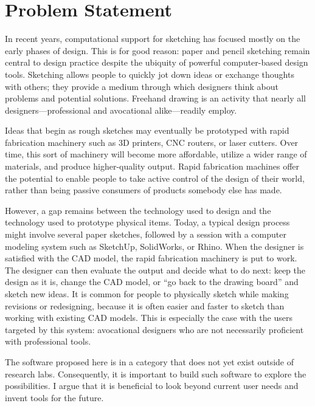 \documentclass[11pt]{article}
\begin{document}
\newpage

\section{Problem Statement}

In recent years, computational support for sketching has focused
mostly on the early phases of design. This is for good reason: paper
and pencil sketching remain central to design practice despite the
ubiquity of powerful computer-based design tools. Sketching allows
people to quickly jot down ideas or exchange thoughts with others;
they provide a medium through which designers think about problems and
potential solutions. Freehand drawing is an activity that nearly all
designers---professional and avocational alike---readily employ.

Ideas that begin as rough sketches may eventually be prototyped with
rapid fabrication machinery such as 3D printers, CNC routers, or laser
cutters. Over time, this sort of machinery will become more
affordable, utilize a wider range of materials, and produce
higher-quality output. Rapid fabrication machines offer the potential
to enable people to take active control of the design of their world,
rather than being passive consumers of products somebody else has
made.

However, a gap remains between the technology used to design and the
technology used to prototype physical items. Today, a typical design
process might involve several paper sketches, followed by a session
with a computer modeling system such as SketchUp, SolidWorks, or
Rhino. When the designer is satisfied with the CAD model, the rapid
fabrication machinery is put to work. The designer can then evaluate
the output and decide what to do next: keep the design as it is,
change the CAD model, or ``go back to the drawing board'' and sketch
new ideas. It is common for people to physically sketch while making
revisions or redesigning, because it is often easier and faster to
sketch than working with existing CAD models. This is especially the
case with the users targeted by this system: avocational designers who
are not necessarily proficient with professional tools.

The software proposed here is in a category that does not yet exist
outside of research labs. Consequently, it is important to build such
software to explore the possibilities. I argue that it is beneficial
to look beyond current user needs and invent tools for the future.
\end{document}
